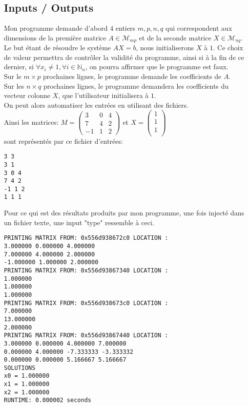 \subsection{Inputs / Outputs}
Mon programme demande d'abord 4 entiers $m,p,n,q$ qui correspondent aux dimensions de la première matrice $A \in \mathcal{M}_{mp}$ et de la seconde matrice $X \in \mathcal{M}_{nq}$. Le but étant de résoudre le système $AX=b$, nous initialiserons $X$ à $1$. Ce choix de valeur permettra de contrôler la validité du programme, ainsi si à la fin de ce dernier, si $\forall x_i \neq 1, \forall i \in \mathbb{N}_{n}$, on pourra affirmer que le programme est faux.  \\
Sur le $m\times p$ prochaines lignes, le programme demande les coefficients de $A$. \\
Sur les $n \times q$ prochaines lignes, le programme demandera les coefficients du vecteur colonne $X$, que l'utilisateur initialisera à $1$. \\
On peut alors automatiser les entrées en utilisant des fichiers. \\
Ainsi les matrices:
$ M = \begin{pmatrix}
3 & 0 & 4\\
7 & 4 & 2 \\
-1 & 1 & 2
\end{pmatrix}
$
et 
$ X = \begin{pmatrix}
1 \\
1 \\
1 \\
\end{pmatrix}
$ \\
sont représentés par ce fichier d'entrées:
\begin{lstlisting}[caption=input.txt, basicstyle=\fontsize{8}{10}\selectfont]
3 3
3 1 
3 0 4
7 4 2
-1 1 2
1 1 1
\end{lstlisting}
Pour ce qui est des résultats produits par mon programme, une fois injecté dans un fichier texte, une input "type" ressemble à ceci. \\
\begin{lstlisting}[caption=Gauss elimination with M and X matrix, basicstyle=\fontsize{8}{10}\selectfont]
PRINTING MATRIX FROM: 0x556d938672c0 LOCATION :
3.000000 0.000000 4.000000
7.000000 4.000000 2.000000
-1.000000 1.000000 2.000000
PRINTING MATRIX FROM: 0x556d93867340 LOCATION :
1.000000
1.000000
1.000000
PRINTING MATRIX FROM: 0x556d938673c0 LOCATION :
7.000000
13.000000
2.000000
PRINTING MATRIX FROM: 0x556d93867440 LOCATION :
3.000000 0.000000 4.000000 7.000000
0.000000 4.000000 -7.333333 -3.333332
0.000000 0.000000 5.166667 5.166667
SOLUTIONS
x0 = 1.000000
x1 = 1.000000
x2 = 1.000000
RUNTIME: 0.000002 seconds 
\end{lstlisting}
